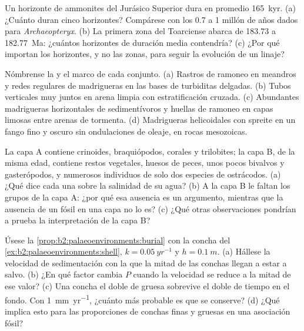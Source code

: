 \begin{exercise}[$\star$]\label{exo:b2:palaeoenvironments:2}
Un horizonte de ammonites del Jurásico Superior dura en promedio \qty{165}{kyr}. (a) ¿Cuánto duran cinco horizontes?
Compárese con los 0.7 a 1 millón de años dados para \emph{Archaeopteryx}. (b) La primera
zona del Toarciense abarca de 183.73 a \qty{182.77}{Ma}: ¿cuántos horizontes de duración media contendría?
(c) ¿Por qué importan los horizontes, y no las zonas, para seguir la evolución de un linaje?
\end{exercise}

\begin{exercise}[$\star$]\label{exo:b2:palaeoenvironments:3}
Nómbrense la  y el marco de cada conjunto. (a) Rastros de ramoneo en meandros y redes regulares de
madrigueras en las bases de turbiditas delgadas. (b) Tubos verticales muy juntos en arena limpia con
estratificación cruzada. (c) Abundantes madrigueras horizontales de sedimentívoros y huellas de ramoneo en capas
limosas entre arenas de tormenta. (d) Madrigueras helicoidales con spreite en un fango fino y oscuro sin ondulaciones
de oleaje, en rocas mesozoicas.
\end{exercise}

\begin{exercise}[$\star$]\label{exo:b2:palaeoenvironments:4}
La capa A contiene crinoides, braquiópodos, corales y trilobites; la capa B, de la misma edad, contiene restos
vegetales, huesos de peces, unos pocos bivalvos y gasterópodos, y numerosos individuos de solo dos especies de
ostrácodos. (a) ¿Qué dice cada una sobre la salinidad de su agua? (b) A la capa B le faltan los grupos de
la capa A: ¿por qué esa ausencia es un argumento, mientras que la ausencia de un fósil en una capa no lo es?
(c) ¿Qué otras observaciones pondrían a prueba la interpretación de la capa B?
\end{exercise}

\begin{exercise}[$\star\star$]\label{exo:b2:palaeoenvironments:5}
Úsese la \cref{prop:b2:palaeoenvironments:burial} con la concha del
\cref{ex:b2:palaeoenvironments:shell}, $k = \qty{0.05}{yr^{-1}}$ y $h = \qty{0.1}{m}$. (a)
Hállese la velocidad de sedimentación con la que la mitad de las conchas llegan a estar a salvo. (b) ¿En qué factor
cambia $P$ cuando la velocidad se reduce a la mitad de ese valor? (c) Una concha el doble de gruesa sobrevive el doble de tiempo
en el fondo. Con \qty{1}{mm.yr^{-1}}, ¿cuánto más probable es que se conserve? (d) ¿Qué implica
esto para las proporciones de conchas finas y gruesas en una asociación fósil?
\end{exercise}

